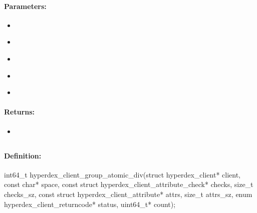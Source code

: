 \paragraph{Parameters:}
\begin{itemize}[noitemsep]
\item {}\\

\item {}\\

\item {}\\

\item {}\\

\item {}\\

\end{itemize}

\paragraph{Returns:}
\begin{itemize}[noitemsep]
\item {}\\

\end{itemize}

\pagebreak
\subsection{}
\label{api:c:group_atomic_div}


\paragraph{Definition:}
\begin{ccode}
int64_t hyperdex_client_group_atomic_div(struct hyperdex_client* client,
        const char* space,
        const struct hyperdex_client_attribute_check* checks, size_t checks_sz,
        const struct hyperdex_client_attribute* attrs, size_t attrs_sz,
        enum hyperdex_client_returncode* status,
        uint64_t* count);
\end{ccode}

